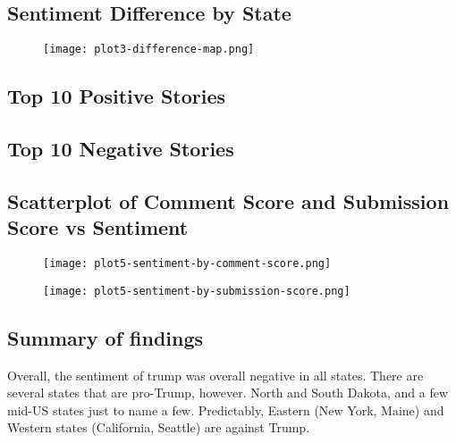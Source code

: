 \documentclass[11pt]{article}
\begin{document}
\subsection{Sentiment Difference by State}
\begin{figure}[H]
    \begin{center}
  \texttt{[image: plot3-difference-map.png]}
    \end{center}
\end{figure}

\subsection{Top 10 Positive Stories}
\subsection{Top 10 Negative Stories}
\subsection{Scatterplot of Comment Score and Submission Score vs Sentiment}
\begin{figure}[H]
    \begin{center}
  \texttt{[image: plot5-sentiment-by-comment-score.png]}
    \end{center}
\end{figure}
\begin{figure}[H]
    \begin{center}
    \texttt{[image: plot5-sentiment-by-submission-score.png]}
    \end{center}
\end{figure}
\subsection{Summary of findings}
Overall, the sentiment of trump was overall negative in all states.
There are several states that are pro-Trump, however. North and South Dakota, and a few mid-US states just to name a few.
Predictably, Eastern (New York, Maine) and Western states (California, Seattle) are against Trump.
\end{document}
